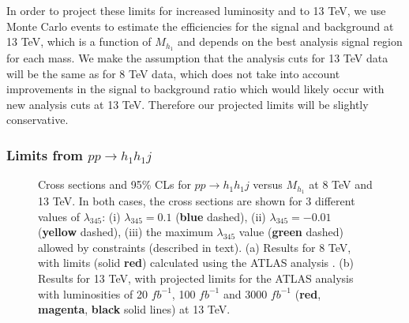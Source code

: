 \documentclass[12pt,a4paper]{article}
\newcommand {\blue} {\color{blue}}
\newcommand {\red} {\color{red}}
\newcommand {\magenta} {\color{Plum}}
\newcommand {\yellow} {\color{NewYellow}}
\newcommand {\green} {\color{NewGreen}}
\begin{document}
In order to project these limits for increased luminosity and to 13 TeV, we use Monte Carlo events to estimate the efficiencies for the signal and background at 13 TeV, which
is a function of $M_{h_1}$ and depends on the best analysis signal region for each mass. We make the assumption that the analysis cuts for 13 TeV data will be the same as for
8 TeV data, which does not take into account improvements in the signal to background ratio which would likely occur with new analysis cuts at 13 TeV. Therefore our projected
limits will be slightly conservative.

\subsubsection{Limits from $pp\rightarrow h_1h_1 j$}

\begin{figure}[h!]
\centering
\caption{Cross sections and 95\% CLs for $pp \to h_1 h_1 j$ versus $M_{h_1}$ at 8 TeV and 13 TeV. In both cases, the cross sections are shown for 3 different values of $\lambda_{345}$: (i) $\lambda_{345}=0.1$ ({\bf \blue blue} dashed), (ii) $\lambda_{345}= -0.01$ ({\bf \yellow yellow} dashed), (iii) the maximum $\lambda_{345}$  value ({\bf \green green} dashed) allowed by constraints (described in text). (a) Results for 8 TeV, with limits (solid {\bf \red red}) calculated using the ATLAS analysis \cite{Aad:2015zva}. (b) Results for 13 TeV, with projected limits for the ATLAS analysis \cite{Aad:2015zva} with luminosities of 20 $fb^{-1}$, 100 $fb^{-1}$ and 3000 $fb^{-1}$ ({\bf \red red}, {\bf \magenta magenta}, {\bf black} solid lines) at 13 TeV.} \label{cc_limit_h1h1}
\end{figure}
\end{document}
